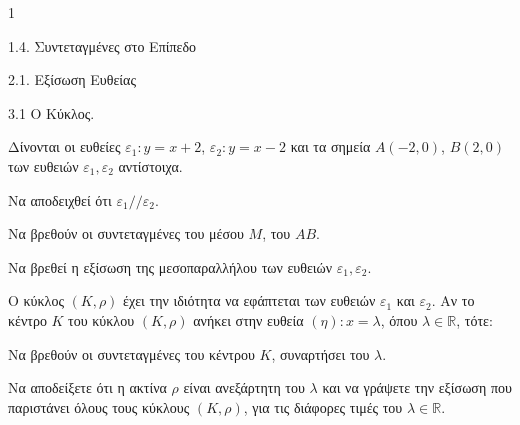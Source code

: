 \begin{ylh}{1}
    \item 1.4. Συντεταγμένες στο Επίπεδο
    \item 2.1. Εξίσωση Ευθείας
    \item 3.1 Ο Κύκλος.
\end{ylh}
\begin{alist}
\item Δίνονται οι ευθείες $\varepsilon_1: y=x+2$, $\varepsilon_2: y=x-2$ και τα σημεία $A(-2,0)$, $B(2,0)$ των ευθειών $\varepsilon_1, \varepsilon_2$ αντίστοιχα.
\begin{rlist}
\item Να αποδειχθεί ότι $\varepsilon_1 // \varepsilon_2$. 
\item Να βρεθούν οι συντεταγμένες του μέσου $M$, του $AB$. 
\item Να βρεθεί η εξίσωση της μεσοπαραλλήλου των ευθειών $\varepsilon_1, \varepsilon_2$. 
\end{rlist}
\item Ο κύκλος $(K, \rho)$ έχει την ιδιότητα να εφάπτεται των ευθειών $\varepsilon_1$ και $\varepsilon_2$. Αν το κέντρο $K$ του κύκλου $(K, \rho)$ ανήκει στην ευθεία $(\eta): x=\lambda$, όπου $\lambda \in \mathbb{R}$, τότε:
\begin{rlist}
\item Να βρεθούν οι συντεταγμένες του κέντρου $K$, συναρτήσει του $\lambda$. 
\item Να αποδείξετε ότι η ακτίνα $\rho$ είναι ανεξάρτητη του $\lambda$ και να γράψετε την εξίσωση που παριστάνει όλους τους κύκλους $(K, \rho)$, για τις διάφορες τιμές του $\lambda \in \mathbb{R}$. 
\end{rlist}
\end{alist}
